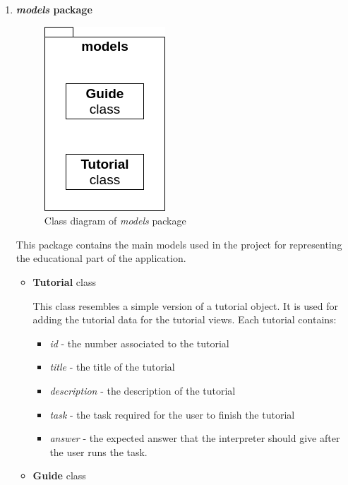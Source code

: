 \documentclass[12pt,a4paper,twoside]{report}
\begin{document}
\begin{enumerate}
 \item \textbf{\textit{models} package}
 
 \begin{figure}[h]
 \centering
 \includegraphics[scale=0.4]{img/diags/ModelsPackage.png}
 \caption{Class diagram of \textit{models} package}
\end{figure}

This package contains the main models used in the project for representing the educational part of the application.  
\begin{itemize}
 \item \textbf{Tutorial} class
    
    This class resembles a simple version of a tutorial object. It is used for adding the tutorial data for the tutorial views. Each tutorial contains:
    \begin{itemize}
        \item \textit{id} - the number associated to the tutorial
        \item \textit{title} - the title of the tutorial
        \item \textit{description} - the description of the tutorial
        \item \textit{task} - the task required for the user to finish the tutorial
        \item \textit{answer} - the expected answer that the interpreter should give after the user runs the task.
    \end{itemize}
    
    \item \textbf{Guide} class
    

\end{itemize}
\end{enumerate}
\end{document}
